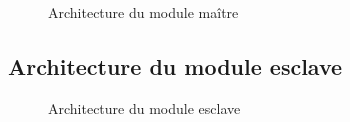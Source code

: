 		\begin{figure}[H]
			\centering
			\caption{Architecture du module maître}
			\label{fig:architecture_master}
		\end{figure}

	\subsection{Architecture du module esclave}

	\begin{figure}[H]
		\centering
		\caption{Architecture du module esclave}
		\label{fig:architecture_slave}
	\end{figure}


